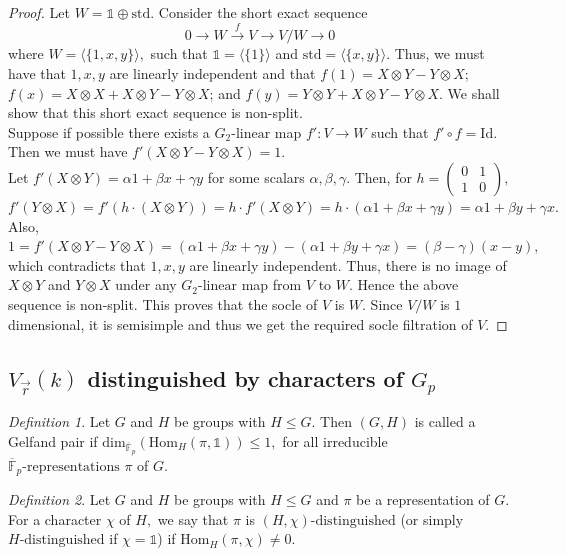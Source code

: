 \documentclass[10pt, reqno]{amsart}
\def\OF{{\overline{\mathbb F}}_p}
\def\Gp{{G_p}}
\def\xtx{{X\otimes X}}
\def\xty{{X\otimes Y}}
\def\ytx{{Y\otimes X}}
\def\yty{{Y\otimes Y}}
\numberwithin{equation}{section}
\theoremstyle{remark}
\newtheorem{definition}{Definition}
\begin{document}
	\begin{proof}
		Let $W=\mathds{1}\oplus \mathrm{std}.$ Consider the short exact sequence
		$$0\longrightarrow W\overset{f}{\longrightarrow}V\overset{}{\longrightarrow}V/W\longrightarrow 0$$ where $W=\langle\{1,x,y\}\rangle,$ such that $\mathds{1}=\langle \{1\}\rangle$ and $\mathrm{std}=\langle\{x,y\}\rangle.$ Thus, we must have that $1,x,y$ are linearly independent and that $f(1)=\xty-\ytx$;
		$f(x)= \xtx+\xty-\ytx$; and $f(y)=\yty+\xty-\ytx.$ We shall show that this short exact sequence is non-split.\\ Suppose if possible there exists a $G_2\text{-linear}$ map $f':V\to W$ such that $f'\circ f=$Id. 
		Then we must have $f'(\xty-\ytx)=1.$\\
        Let $f'(\xty)=\alpha 1+\beta x+\gamma y$ for some scalars $\alpha,\beta,\gamma.$ Then, for $h=\left(\begin{matrix}
			0 & 1 \\
			1 & 0
		\end{matrix}\right),$ $f'(\ytx)=f'(h\cdot(\xty))=h\cdot f'(\xty)=h\cdot(\alpha 1+\beta x+\gamma y) = \alpha 1+\beta y+\gamma x.$ Also, $1=f'(\xty-\ytx)=(\alpha 1+\beta x+\gamma y)-(\alpha 1+\beta y+\gamma x)=(\beta-\gamma)(x-y),$ which contradicts that $1,x,y$ are linearly independent. Thus, there is no image of $\xty$ and $\ytx$ under any $G_2\text{-linear}$ map from $V$ to $W.$ Hence the above sequence is non-split. This proves that the socle of $V$ is $W.$ Since $V/W$ is $1$ dimensional, it is semisimple and thus we get the required socle filtration of $V.$
	\end{proof}
	
	\subsection{$V_{\vec{r}}(k)$ distinguished by characters of $\Gp$}\label{SS2}
	\begin{definition}
		Let $G$ and $H$ be groups with $H\leq G.$ Then $(G,H)$ is called a Gelfand pair if $\mathrm{dim}_{\OF}(\mathrm{Hom}_H(\pi,\mathds{1}))\leq 1,$ for all irreducible $\OF\text{-representations }\pi$ of $G.$
	\end{definition}

    \begin{definition}\label{Def}
		Let $G$ and $H$ be groups with $H\leq G$ and $\pi$ be a representation of $G.$ For a character $\chi$ of $H,$ we say that $\pi$ is $(H,\chi)\text{-distinguished}$ (or simply $H\text{-distinguished}$ if $\chi=\mathds{1}$) if $\mathrm{Hom}_H(\pi,\chi)\neq 0.$
	\end{definition}
	
\end{document}
